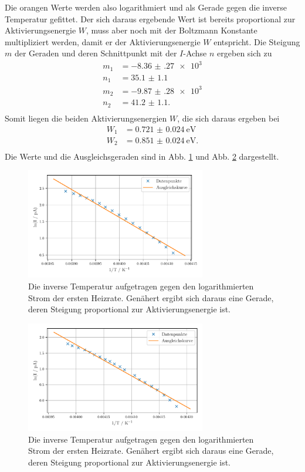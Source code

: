 Die orangen Werte werden also logarithmiert und als Gerade gegen die inverse Temperatur gefittet. Der sich daraus ergebende Wert ist bereits proportional zur Aktivierungsenergie $W$, muss aber noch mit der Boltzmann Konstante multipliziert werden, damit er der Aktivierungsenergie $W$ entspricht. Die Steigung $m$ der Geraden und deren Schnittpunkt mit der $I$-Achse $n$ ergeben sich zu 
\begin{align*}
     m_{1} &= \num{-8.36(27)e3} \\
     n_{1} &= \num{35.1(11)} \\
     m_{2} &= \num{-9.87(28)e3} \\
     n_{2} &= \num{41.2(11)}. \\
\end{align*}
Somit liegen die beiden Aktivierungsenergien $W$, die sich daraus ergeben bei 
\begin{align*}
    W_{1} &= \SI{0.721(24)}{\electronvolt} \\
    W_{2} &= \SI{0.851(24)}{\electronvolt}. \\
\end{align*}
Die Werte und die Ausgleichsgeraden sind in Abb. \ref{abb:anlauf1} und Abb. \ref{abb:anlauf2} dargestellt. 

\begin{figure}
    \centering
    \includegraphics[width=0.7\textwidth]{figures/anlauf1.pdf}
    \caption{Die inverse Temperatur aufgetragen gegen den logarithmierten Strom der ersten Heizrate. Genähert ergibt sich daraus eine Gerade, deren Steigung proportional zur Aktivierungsenergie ist.}
    \label{abb:anlauf1}
\end{figure}

\begin{figure}
    \centering
    \includegraphics[width=0.7\textwidth]{figures/anlauf2.pdf}
    \caption{Die inverse Temperatur aufgetragen gegen den logarithmierten Strom der ersten Heizrate. Genähert ergibt sich daraus eine Gerade, deren Steigung proportional zur Aktivierungsenergie ist.}
    \label{abb:anlauf2}
\end{figure}

